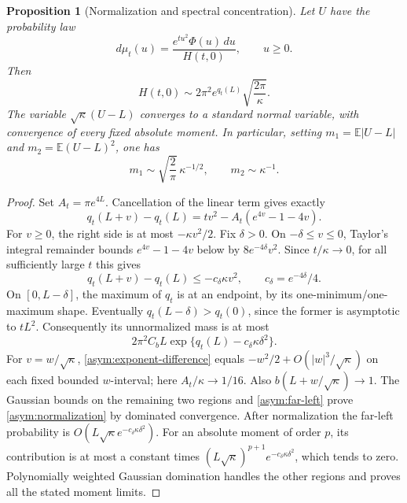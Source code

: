 \documentclass[11pt]{article}
\newtheorem{proposition}[theorem]{Proposition}
\theoremstyle{definition}
\newcommand{\dd}{\,d}
\begin{document}
\begin{proposition}[Normalization and spectral concentration]
\label{asym:concentration}
Let $U$ have the probability law
\[
 d\mu_t(u)=\frac{e^{tu^2}\Phi(u)\dd u}{H(t,0)},\qquad u\ge0.
\]
Then
\begin{equation}\label{asym:normalization}
 H(t,0)\sim2\pi^2e^{q_t(L)}\sqrt{\frac{2\pi}{\kappa}}.
\end{equation}
The variable $\sqrt\kappa(U-L)$ converges to a standard normal variable,
with convergence of every fixed absolute moment.  In particular, setting
$m_1=\mathbb E|U-L|$ and $m_2=\mathbb E(U-L)^2$, one has
\begin{equation}\label{asym:moments}
 m_1\sim\sqrt{\frac2\pi}\,\kappa^{-1/2},\qquad
 m_2\sim\kappa^{-1}.
\end{equation}
\end{proposition}
\begin{proof}
Set $A_t=\pi e^{4L}$.  Cancellation of the linear term gives exactly
\begin{equation}\label{asym:exponent-difference}
 q_t(L+v)-q_t(L)=tv^2-A_t(e^{4v}-1-4v).
\end{equation}
For $v\ge0$, the right side is at most $-\kappa v^2/2$.
Fix $\delta>0$.  On $-\delta\le v\le0$, Taylor's integral remainder
bounds $e^{4v}-1-4v$ below by $8e^{-4\delta}v^2$.
Since $t/\kappa\to0$, for all sufficiently large $t$ this gives
\begin{equation}\label{asym:local-tail}
 q_t(L+v)-q_t(L)\le-c_\delta\kappa v^2,
 \qquad c_\delta=e^{-4\delta}/4.
\end{equation}
On $[0,L-\delta]$, the maximum of $q_t$ is at an endpoint, by its
one-minimum/one-maximum shape.  Eventually
$q_t(L-\delta)>q_t(0)$, since the former is asymptotic to $tL^2$.
Consequently its unnormalized mass is at most
\begin{equation}\label{asym:far-left}
 2\pi^2 C_b L\exp\{q_t(L)-c_\delta\kappa\delta^2\}.
\end{equation}
For $v=w/\sqrt\kappa$, \eqref{asym:exponent-difference} equals
$-w^2/2+O(|w|^3/\sqrt\kappa)$ on each fixed bounded $w$-interval;
here $A_t/\kappa\to1/16$.  Also $b(L+w/\sqrt\kappa)\to1$.
The Gaussian bounds on the remaining two regions and
\eqref{asym:far-left} prove \eqref{asym:normalization} by dominated
convergence.  After normalization the far-left probability is
$O(L\sqrt\kappa e^{-c_\delta\kappa\delta^2})$.
For an absolute moment of order $p$, its contribution is at most a
constant times $(L\sqrt\kappa)^{p+1}e^{-c_\delta\kappa\delta^2}$,
which tends to zero.  Polynomially weighted Gaussian domination handles
the other regions and proves all the stated moment limits.
\end{proof}
\end{document}
